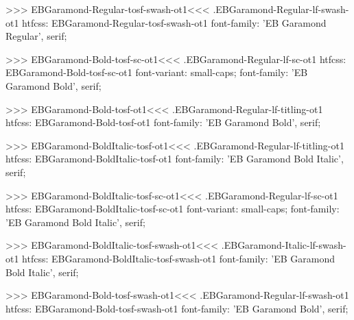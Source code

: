 {{{{{{{>>>
\<EBGaramond-Regular-tosf-swash-ot1\><<<
.EBGaramond-Regular-lf-swash-ot1
htfcss:  EBGaramond-Regular-tosf-swash-ot1  font-family: 'EB Garamond Regular', serif;

>>>
\<EBGaramond-Bold-tosf-sc-ot1\><<<
.EBGaramond-Regular-lf-sc-ot1
htfcss:  EBGaramond-Bold-tosf-sc-ot1  font-variant: small-caps; font-family: 'EB Garamond Bold', serif;

>>>
\<EBGaramond-Bold-tosf-ot1\><<<
.EBGaramond-Regular-lf-titling-ot1
htfcss:  EBGaramond-Bold-tosf-ot1  font-family: 'EB Garamond Bold', serif;

>>>
\<EBGaramond-BoldItalic-tosf-ot1\><<<
.EBGaramond-Regular-lf-titling-ot1
htfcss:  EBGaramond-BoldItalic-tosf-ot1  font-family: 'EB Garamond Bold Italic', serif;

>>>
\<EBGaramond-BoldItalic-tosf-sc-ot1\><<<
.EBGaramond-Regular-lf-sc-ot1
htfcss:  EBGaramond-BoldItalic-tosf-sc-ot1  font-variant: small-caps; font-family: 'EB Garamond Bold Italic', serif;

>>>
\<EBGaramond-BoldItalic-tosf-swash-ot1\><<<
.EBGaramond-Italic-lf-swash-ot1
htfcss:  EBGaramond-BoldItalic-tosf-swash-ot1  font-family: 'EB Garamond Bold Italic', serif;

>>>
\<EBGaramond-Bold-tosf-swash-ot1\><<<
.EBGaramond-Regular-lf-swash-ot1
htfcss:  EBGaramond-Bold-tosf-swash-ot1  font-family: 'EB Garamond Bold', serif;

}}}}}}}
